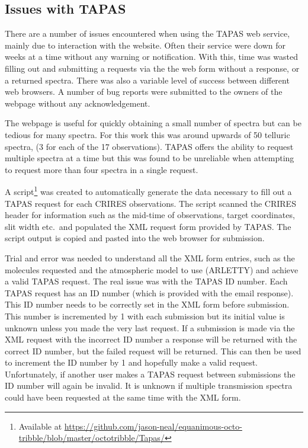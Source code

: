 \subsection{Issues with {TAPAS}}
There are a number of issues encountered when using the {TAPAS} web service, mainly due to interaction with the website.
Often their service were down for weeks at a time without any warning or notification.
With this, time was wasted filling out and submitting a requests via the the web form without a response, or a returned spectra.
There was also a variable level of success between different web browsers.
A number of bug reports were submitted to the owners of the webpage without any acknowledgement.

The webpage is useful for quickly obtaining a small number of spectra but can be tedious for many spectra.
For this work this was around upwards of 50 telluric spectra, (3 for each of the 17 observations).
{TAPAS} offers the ability to request multiple spectra at a time but this was found to be unreliable when attempting to request more than four spectra in a single request.

A script\footnote{Available at \href{https://github.com/jason-neal/equanimous-octo-tribble/blob/master/octotribble/Tapas/}{https://github.com/jason-neal/equanimous-octo-tribble/blob/master/octotribble/Tapas/}} was created to automatically generate the data necessary to fill out a {TAPAS} request for each {CRIRES} observations.
The script scanned the {CRIRES} header for information such as the mid-time of observations, target coordinates, slit width etc.\ and populated the {XML} request form provided by {TAPAS}.
The script output is copied and pasted into the web browser for submission.

Trial and error was needed to understand all the {XML} form entries, such as the molecules requested and the atmospheric model to use ({ARLETTY}) and achieve a valid {TAPAS} request.
The real issue was with the {TAPAS} {{ID}} number.
Each {TAPAS} request has an {ID} number (which is provided with the email response).
This {ID} number needs to be correctly set in the {XML} form before submission.
This number is incremented by 1 with each submission but its initial value is unknown unless you made the very last request.
If a submission is made via the {XML} request with the incorrect {ID} number a response will be returned with the correct {ID} number, but the failed request will be returned.
This can then be used to increment the {ID} number by 1 and hopefully make a valid request.
Unfortunately, if another user makes a {TAPAS} request between submissions the {ID} number will again be invalid.
It is unknown if multiple transmission spectra could have been requested at the same time with the {XML} form.

